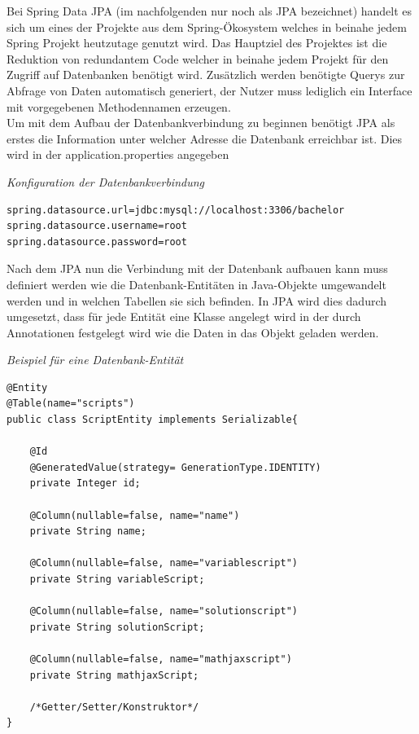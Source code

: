 Bei Spring Data JPA (im nachfolgenden nur noch als JPA bezeichnet) handelt es sich um eines der Projekte aus dem Spring-Ökosystem welches in beinahe jedem Spring Projekt heutzutage genutzt wird. Das Hauptziel des Projektes ist die Reduktion von redundantem Code welcher in beinahe jedem Projekt für den Zugriff auf Datenbanken benötigt wird. Zusätzlich werden benötigte Querys zur Abfrage von Daten automatisch generiert, der Nutzer muss lediglich ein Interface mit vorgegebenen Methodennamen erzeugen. \\

Um mit dem Aufbau der Datenbankverbindung zu beginnen benötigt JPA als erstes die Information unter welcher Adresse die Datenbank erreichbar ist. Dies wird in der application.properties angegeben \\

\begin{minipage}{\textwidth}
\emph{Konfiguration der Datenbankverbindung}
\begin{lstlisting}
spring.datasource.url=jdbc:mysql://localhost:3306/bachelor
spring.datasource.username=root
spring.datasource.password=root
\end{lstlisting} 
\end{minipage}

Nach dem JPA nun die Verbindung mit der Datenbank aufbauen kann muss definiert werden wie die Datenbank-Entitäten in Java-Objekte umgewandelt werden und in welchen Tabellen sie sich befinden. In JPA wird dies dadurch umgesetzt, dass für jede Entität eine Klasse angelegt wird in der durch Annotationen festgelegt wird wie die Daten in das Objekt geladen werden. \\

\begin{minipage}{\textwidth}
\emph{Beispiel für eine Datenbank-Entität}
\begin{lstlisting}
@Entity
@Table(name="scripts")
public class ScriptEntity implements Serializable{

	@Id
	@GeneratedValue(strategy= GenerationType.IDENTITY)
	private Integer id;
	
	@Column(nullable=false, name="name")
	private String name;
	
	@Column(nullable=false, name="variablescript")
	private String variableScript;
	
	@Column(nullable=false, name="solutionscript")
	private String solutionScript;

	@Column(nullable=false, name="mathjaxscript")
	private String mathjaxScript;
	
	/*Getter/Setter/Konstruktor*/
}
\end{lstlisting}
\end{minipage}

